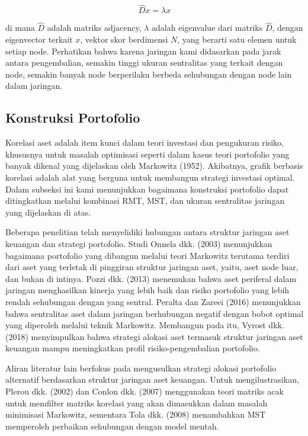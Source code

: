 \documentclass[12pt,a4paper]{article}
\begin{document}
\begin{equation}
\hat{D}x = \lambda x
\end{equation}

di mana $\hat{D}$ adalah matriks adjacency, $\lambda$ adalah eigenvalue dari matriks $\hat{D}$, dengan eigenvector terkait $x$, vektor skor berdimensi $N$, yang berarti satu elemen untuk setiap node. Perhatikan bahwa karena jaringan kami didasarkan pada jarak antara pengembalian, semakin tinggi ukuran sentralitas yang terkait dengan node, semakin banyak node berperilaku berbeda sehubungan dengan node lain dalam jaringan.

\subsection{Konstruksi Portofolio}

Korelasi aset adalah item kunci dalam teori investasi dan pengukuran risiko, khususnya untuk masalah optimisasi seperti dalam kasus teori portofolio yang banyak dikenal yang dijelaskan oleh Markowitz (1952)\cite{markowitz1952}. Akibatnya, grafik berbasis korelasi adalah alat yang berguna untuk membangun strategi investasi optimal. Dalam subseksi ini kami menunjukkan bagaimana konstruksi portofolio dapat ditingkatkan melalui kombinasi RMT, MST, dan ukuran sentralitas jaringan yang dijelaskan di atas.

Beberapa penelitian telah menyelidiki hubungan antara struktur jaringan aset keuangan dan strategi portofolio. Studi Onnela dkk. (2003)\cite{onnela2003} menunjukkan bagaimana portofolio yang dibangun melalui teori Markowitz terutama terdiri dari aset yang terletak di pinggiran struktur jaringan aset, yaitu, aset node luar, dan bukan di intinya. Pozzi dkk. (2013)\cite{pozzi2013} menemukan bahwa aset periferal dalam jaringan menghasilkan kinerja yang lebih baik dan risiko portofolio yang lebih rendah sehubungan dengan yang sentral. Peralta dan Zareei (2016)\cite{peralta2016} menunjukkan bahwa sentralitas aset dalam jaringan berhubungan negatif dengan bobot optimal yang diperoleh melalui teknik Markowitz. Membangun pada itu, Vyrost dkk. (2018)\cite{vyrost2018} menyimpulkan bahwa strategi alokasi aset termasuk struktur jaringan aset keuangan mampu meningkatkan profil risiko-pengembalian portofolio.

Aliran literatur lain berfokus pada mengusulkan strategi alokasi portofolio alternatif berdasarkan struktur jaringan aset keuangan. Untuk mengilustrasikan, Plerou dkk. (2002)\cite{plerou2002} dan Conlon dkk. (2007)\cite{conlon2007} menggunakan teori matriks acak untuk memfilter matriks korelasi yang akan dimasukkan dalam masalah minimisasi Markowitz, sementara Tola dkk. (2008)\cite{tola2008} menambahkan MST memperoleh perbaikan sehubungan dengan model mentah.
\end{document}
